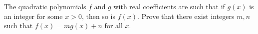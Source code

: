 The quadratic polynomials $f$ and $g$ with real coefficients are such that if $g(x)$ is an integer for some $x>0$, then so is $f(x)$. Prove that there exist integers $m,n$ such that $f(x)=mg(x)+n$ for all $x$.